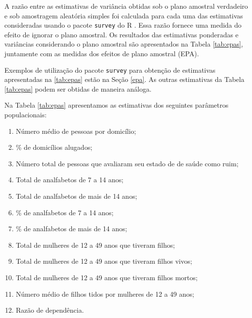 \documentclass[]{book}
\providecommand{\tightlist}{%
  \setlength{\itemsep}{0pt}\setlength{\parskip}{0pt}}
\theoremstyle{definition}
\theoremstyle{definition}
\theoremstyle{definition}
\theoremstyle{remark}
\begin{document}
A razão entre as estimativas de variância obtidas sob o plano amostral
verdadeiro e sob amostragem aleatória simples foi calculada para cada
uma das estimativas consideradas usando o pacote \texttt{survey} do R
\citep{R-survey}. Essa razão fornece uma medida do efeito de ignorar o
plano amostral. Os resultados das estimativas ponderadas e variâncias
considerando o plano amostral são apresentados na Tabela \ref{tab:epas},
juntamente com as medidas dos efeitos de plano amostral (EPA).

Exemplos de utilização do pacote \texttt{survey} para obtenção de
estimativas apresentadas na \ref{tab:epas} estão na Seção \ref{epa}. As
outras estimativas da Tabela \ref{tab:epas} podem ser obtidas de maneira
análoga.

Na Tabela \ref{tab:epas} apresentamos as estimativas dos seguintes
parâmetros populacionais:

\begin{enumerate}
\def\labelenumi{\arabic{enumi}.}
\tightlist
\item
  Número médio de pessoas por domicílio;
\item
  \% de domicílios alugados;
\item
  Número total de pessoas que avaliaram seu estado de de saúde como
  ruim;
\item
  Total de analfabetos de 7 a 14 anos;
\item
  Total de analfabetos de mais de 14 anos;
\item
  \% de analfabetos de 7 a 14 anos;
\item
  \% de analfabetos de mais de 14 anos;
\item
  Total de mulheres de 12 a 49 anos que tiveram filhos;
\item
  Total de mulheres de 12 a 49 anos que tiveram filhos vivos;
\item
  Total de mulheres de 12 a 49 anos que tiveram filhos mortos;
\item
  Número médio de filhos tidos por mulheres de 12 a 49 anos;
\item
  Razão de dependência.
\end{enumerate}
\end{document}
